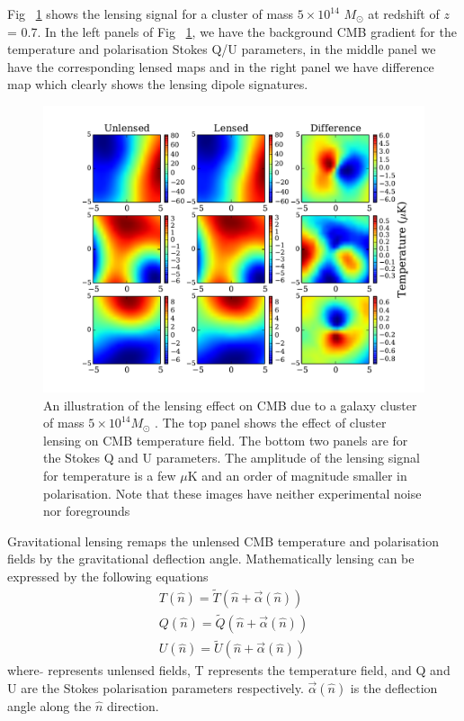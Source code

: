 Fig ~\ref{fig:lensing_signal} shows the lensing signal for a cluster of mass $5 \times 10^{14}$ $M_{\odot}$ at redshift of $z$ = 0.7.
In  the left panels of Fig ~\ref{fig:lensing_signal}, we have the background CMB gradient for the temperature and polarisation Stokes Q/U parameters, in the middle panel we have the corresponding lensed maps and in the right panel we have difference map which clearly shows the lensing dipole signatures.
\begin{figure}[ht]
\begin{center}
\includegraphics[width=\linewidth, keepaspectratio]{figs/lensing_signal.pdf}
 \caption{An illustration of the lensing effect on CMB due to a galaxy cluster of mass $5\times 10^{14} M_{\odot}$ .
  The top panel shows the effect of cluster lensing on CMB temperature field.
  The bottom two panels are for the Stokes Q and U parameters.
  The amplitude of the lensing signal for temperature is a few $\mu$K and an order of magnitude smaller in polarisation.
  Note that these images have neither experimental noise nor foregrounds
 } 
\label{fig:lensing_signal}
\end{center}
\end{figure}

Gravitational lensing remaps the unlensed CMB temperature and polarisation fields by the gravitational deflection angle. Mathematically lensing can be expressed by the following equations
\begin{eqnarray}
T(\hat{n}) = \widetilde{T}(\hat{n} + \vec{\alpha}(\hat{n}))\\
Q(\hat{n}) = \widetilde{Q}(\hat{n} + \vec{\alpha}(\hat{n}))\\
U(\hat{n}) =  \widetilde{U}(\hat{n} + \vec{\alpha}(\hat{n}))
\end{eqnarray}
where $\widetilde{}$ represents unlensed fields, T represents the temperature field, and Q and U are the Stokes polarisation parameters respectively. 
$\vec{\alpha}(\hat{n})$ is the deflection angle along the $\hat{n}$ direction. 
\\

